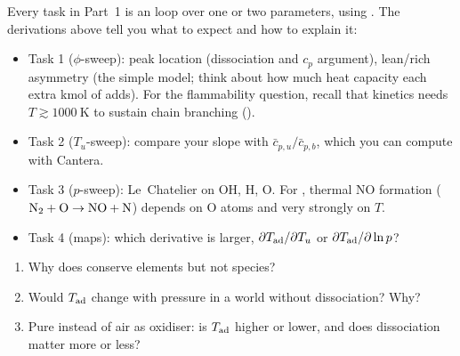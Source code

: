 \begin{project}[Part 1]
Every task in Part~1 is an  loop over one or two parameters, using
. The derivations above tell you what to expect and how to explain it:
\begin{itemize}
  \item Task 1 ($\phi$-sweep): peak location (dissociation and $c_p$ argument), lean/rich asymmetry
        (the simple model; think about how much heat capacity each extra kmol of  adds).
        For the flammability question, recall that kinetics needs $T\gtrsim\SI{1000}{\kelvin}$ to sustain
        chain branching ().
  \item Task 2 ($T_u$-sweep): compare your slope with $\bar c_{p,u}/\bar c_{p,b}$, which you can
        compute with Cantera.
  \item Task 3 ($p$-sweep): Le~Chatelier on OH, H, O. For , thermal NO formation
        ($\mathrm{N_2}+\mathrm{O}\to\mathrm{NO}+\mathrm{N}$) depends on O atoms and very strongly on $T$.
  \item Task 4 (maps): which derivative is larger, $\partial T_{\mathrm{ad}}/\partial T_u$ or
        $\partial T_{\mathrm{ad}}/\partial\ln p$?
\end{itemize}
\end{project}

\begin{selfcheck}
\begin{enumerate}
  \item Why does  conserve elements but not species?
  \item Would $T_{\mathrm{ad}}$ change with pressure in a world without dissociation? Why?
  \item Pure  instead of air as oxidiser: is $T_{\mathrm{ad}}$ higher or lower, and does dissociation
        matter more or less?
\end{enumerate}
\end{selfcheck}
